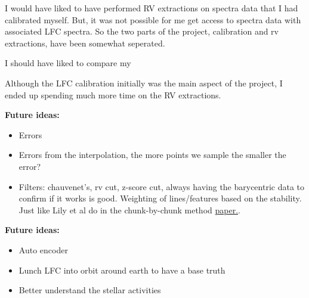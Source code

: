 
I would have liked to have performed RV extractions on spectra data that I had calibrated myself. But, it was not possible for me get access to spectra data with associated LFC spectra. So the two parts of the project, calibration and rv extractions, have been somewhat seperated. 


I should have liked to compare my 

Although the LFC calibration initially was the main aspect of the project, I ended up spending much more time on the RV extractions. 


\textbf{Future ideas:}
\begin{itemize}
    \item Errors
    \item Errors from the interpolation, the more points we sample the smaller the error?
    \item Filters: chauvenet's, rv cut, z-score cut, always having the barycentric data to confirm if it works is good. Weighting of lines/features based on the stability. Just like Lily et al do in the chunk-by-chunk method \href{https://backend.orbit.dtu.dk/ws/portalfiles/portal/273001166/Zhao_2022_AJ_163_171.pdf}{paper.}.

\end{itemize}


\textbf{Future ideas:}
\begin{itemize}
    \item Auto encoder
    \item Lunch LFC into orbit around earth to have a base truth
    \item Better understand the stellar activities
\end{itemize}